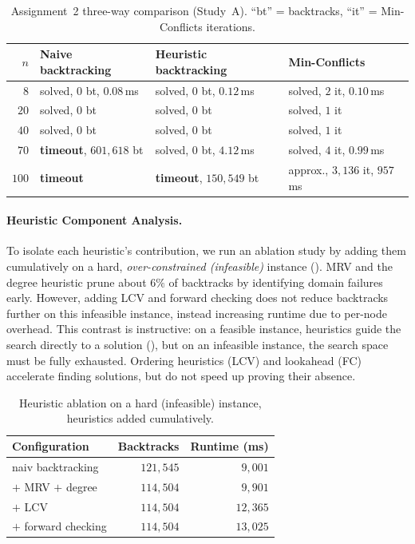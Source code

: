 \documentclass{ai-lab-report}
\begin{document}
\begin{table}[H]
\centering
\small
\begin{tabularx}{\linewidth}{@{}rXXX@{}}
\toprule
$n$ & Naive backtracking & Heuristic backtracking & Min-Conflicts \\
\midrule
$8$   & solved, $0$ bt, $0.08$\,ms & solved, $0$ bt, $0.12$\,ms & solved, $2$ it, $0.10$\,ms \\
$20$  & solved, $0$ bt & solved, $0$ bt & solved, $1$ it \\
$40$  & solved, $0$ bt & solved, $0$ bt & solved, $1$ it \\
$70$  & \textbf{timeout}, $601{,}618$ bt & solved, $0$ bt, $4.12$\,ms & solved, $4$ it, $0.99$\,ms \\
$100$ & \textbf{timeout} & \textbf{timeout}, $150{,}549$ bt & approx., $3{,}136$ it, $957$\,ms \\
\bottomrule
\end{tabularx}
\caption{Assignment~2 three-way comparison (Study~A). ``bt'' = backtracks, ``it'' = Min-Conflicts iterations.}
\label{tab:a2threeway}
\end{table}

\paragraph{Heuristic Component Analysis.}
To isolate each heuristic's contribution, we run an ablation study by adding them cumulatively on a hard, \emph{over-constrained (infeasible)} instance (). MRV and the degree heuristic prune about $6\%$ of backtracks by identifying domain failures early. However, adding LCV and forward checking does not reduce backtracks further on this infeasible instance, instead increasing runtime due to per-node overhead. This contrast is instructive: on a feasible instance, heuristics guide the search directly to a solution (), but on an infeasible instance, the search space must be fully exhausted. Ordering heuristics (LCV) and lookahead (FC) accelerate finding solutions, but do not speed up proving their absence.

\begin{table}[H]
\centering
\small
\begin{tabularx}{\linewidth}{@{}Xrr@{}}
\toprule
Configuration & Backtracks & Runtime (ms) \\
\midrule
naiv backtracking & $121{,}545$ & $9{,}001$ \\
$+$ MRV $+$ degree & $114{,}504$ & $9{,}901$ \\
$+$ LCV            & $114{,}504$ & $12{,}365$ \\
$+$ forward checking & $114{,}504$ & $13{,}025$ \\
\bottomrule
\end{tabularx}
\caption{Heuristic ablation on a hard (infeasible) instance, heuristics added cumulatively.}
\label{tab:a2ablation}
\end{table}
\end{document}
